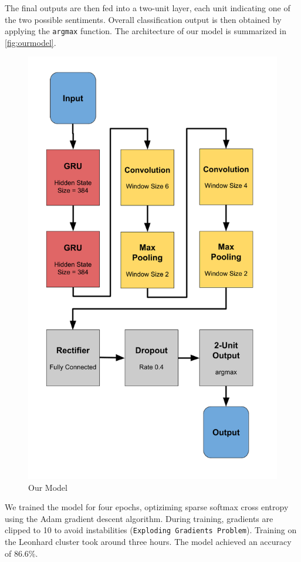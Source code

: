 \documentclass[10pt,conference,compsocconf]{IEEEtran}
\begin{document}
The final outputs are then fed into a two-unit layer, each unit
indicating one of the two possible sentiments. Overall classification
output is then obtained by applying the \texttt{argmax} function.
The architecture of our model is summarized in \autoref{fig:ourmodel}.

\begin{figure}[h!]
  \centering
  \includegraphics[scale=0.35]{our_model_architecture.png}
  \caption{Our Model}
  \label{fig:ourmodel}
\end{figure}

We trained the model for four epochs, optiziming sparse softmax cross
entropy using the Adam gradient descent algorithm. During training,
gradients are clipped to 10 to avoid instabilities (\texttt{Exploding
  Gradients Problem}). Training on the Leonhard cluster took around
three hours. The model achieved an accuracy of 86.6\%.
\end{document}
